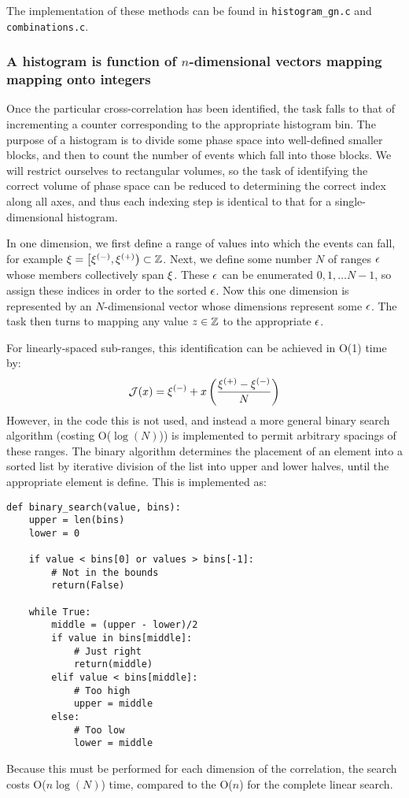 The implementation of these methods can be found in \texttt{histogram\_gn.c} and \texttt{combinations.c}.

\subsubsection{A histogram is function of $n$-dimensional vectors mapping mapping onto integers}
Once the particular cross-correlation has been identified, the task falls to that of incrementing a counter corresponding to the appropriate histogram bin. The purpose of a histogram is to divide some phase space into well-defined smaller blocks, and then to count the number of events which fall into those blocks. We will restrict ourselves to rectangular volumes, so the task of identifying the correct volume of phase space can be reduced to determining the correct index along all axes, and thus each indexing step is identical to that for a single-dimensional histogram. 

In one dimension, we first define a range of values into which the events can fall, for example $\xi=\left[\xi^{(-)},\xi^{(+)}\right)\subset\mathbb{Z}$. Next, we define some number $N$ of ranges $\epsilon$ whose members collectively span $\xi$. These $\epsilon$ can be enumerated $0,1,\ldots N-1$, so assign these indices in order to the sorted $\epsilon$. Now this one dimension is represented by an $N$-dimensional vector whose dimensions represent some $\epsilon$. The task then turns to mapping any value $z\in\mathbb{Z}$ to the appropriate $\epsilon$.

For linearly-spaced sub-ranges, this identification can be achieved in O(1) time by:
\begin{equation}
\mathcal{J}(x) = \xi^{(-)} + x\left( \frac{\xi^{(+)}-\xi^{(-)}}{N} \right)
\end{equation}
However, in the code this is not used, and instead a more general binary search algorithm (costing O($\log(N)$)) is implemented to permit arbitrary spacings of these ranges. The binary algorithm determines the placement of an element into a sorted list by iterative division of the list into upper and lower halves, until the appropriate element is define. This is implemented as:
\lstset{language=Python}
\begin{lstlisting}
def binary_search(value, bins):
    upper = len(bins)
    lower = 0
    
    if value < bins[0] or values > bins[-1]:
        # Not in the bounds
        return(False)
     
    while True:
        middle = (upper - lower)/2
        if value in bins[middle]:
            # Just right
            return(middle)
        elif value < bins[middle]:
            # Too high
            upper = middle
        else:
            # Too low
            lower = middle
\end{lstlisting}
Because this must be performed for each dimension of the correlation, the search costs O($n\log{(N)}$) time, compared to the O($n$) for the complete linear search. 

